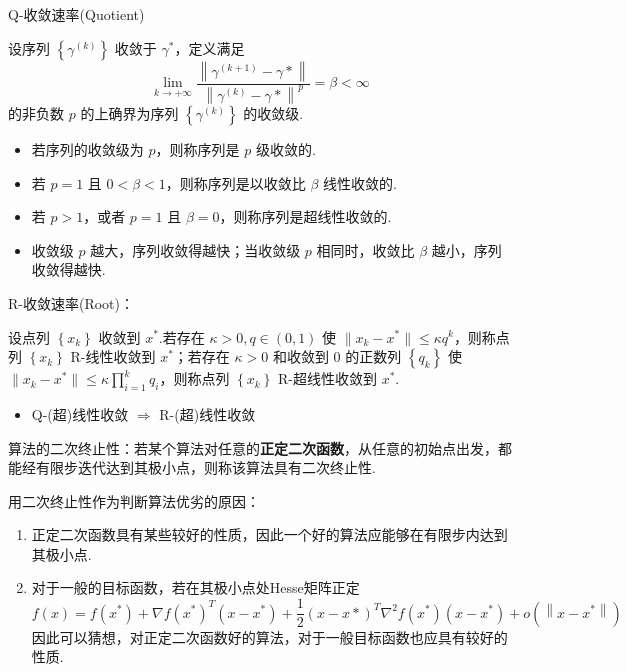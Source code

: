 \begin{note}
    Q-收敛速率(Quotient)

    设序列 $\left\{\gamma^{(k)}\right\}$ 收敛于 $\gamma^*$，定义满足 \[\lim _{k \rightarrow+\infty} \frac{\left\|\gamma^{(k+1)}-\gamma *\right\|}{\left\|\gamma^{(k)}-\gamma *\right\|^{p}}=\beta<\infty\] 的非负数 $p$ 的上确界为序列 $\left\{\gamma^{(k)}\right\}$ 的收敛级.
    \begin{itemize}
        \item 若序列的收敛级为 $p$，则称序列是 $p$ 级收敛的.
        \item 若 $p = 1$ 且 $0 < \beta < 1$，则称序列是以收敛比 $\beta$ 线性收敛的.
        \item 若 $p > 1$，或者 $p = 1$ 且 $\beta = 0$，则称序列是超线性收敛的.
        \item 收敛级 $p$ 越大，序列收敛得越快；当收敛级 $p$ 相同时，收敛比 $\beta$ 越小，序列收敛得越快.
    \end{itemize}
\end{note}

\begin{note}
    R-收敛速率(Root)：

    设点列 $\left\{x_k\right\}$ 收敛到 $x^*$.若存在 $\kappa>0, q \in(0,1)$ 使 $\|x_k - x^*\| \le \kappa q^k$，则称点列 $\left\{x_k\right\}$ R-线性收敛到 $x^*$；若存在 $\kappa > 0$ 和收敛到 $0$ 的正数列 $\left\{q_k\right\}$ 使 $\|x_k - x^*\| \le \kappa \prod_{i = 1}^k q_i$，则称点列 $\left\{x_k\right\}$ R-超线性收敛到 $x^*$.

    \begin{itemize}
        \item Q-(超)线性收敛 $\Longrightarrow$ R-(超)线性收敛
    \end{itemize}
\end{note}

\begin{note}
    算法的二次终止性：若某个算法对任意的\textbf{正定二次函数}，从任意的初始点出发，都能经有限步迭代达到其极小点，则称该算法具有二次终止性.
    
    用二次终止性作为判断算法优劣的原因：
    \begin{enumerate}
        \item 正定二次函数具有某些较好的性质，因此一个好的算法应能够在有限步内达到其极小点.
        \item 对于一般的目标函数，若在其极小点处Hesse矩阵正定\[f(x) =f\left(x^{*}\right)+\nabla f\left(x^{*}\right)^{T}\left(x-x^{*}\right) 
        +\frac{1}{2}(x-x *)^{T} \nabla^{2} f\left(x^{*}\right)\left(x-x^{*}\right)+o\left(\left\|x-x^{*}\right\|\right)\]
        因此可以猜想，对正定二次函数好的算法，对于一般目标函数也应具有较好的性质.
    \end{enumerate}
\end{note}

